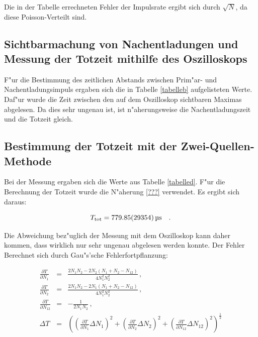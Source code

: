 	Die in der Tabelle errechneten Fehler der Impulsrate ergibt sich durch $\sqrt{N}$, da diese Poisson-Verteilt sind.

	\subsection{Sichtbarmachung von Nachentladungen und Messung der Totzeit mithilfe des Oszilloskops} %
	 \label{sub:sichtbarmachung_von_nachentladungen}

	
	
	F"ur die Bestimmung des zeitlichen Abstands zwischen Prim"ar- und Nachentladungsimpuls ergaben sich die in Tabelle \ref{tabelleb} aufgelisteten Werte. Daf"ur wurde die Zeit zwischen den auf dem Oszilloskop sichtbaren Maximas abgelesen.
	Da dies sehr ungenau ist, ist n"aherungsweise die Nachentladungszeit und die Totzeit gleich.

	\subsection{Bestimmung der Totzeit mit der Zwei-Quellen-Methode} %
	\label{sub:bestimmung_der_totzeit_mit_der_zwei_quellen_methode}
	
	

	Bei der Messung ergaben sich die Werte aus Tabelle \ref{tabelled}.
	F"ur die Berechnung der Totzeit wurde die N"aherung \eqref{???} verwendet.
	Es ergibt sich daraus:

	\begin{equation*}
		T_\mathrm{tot} = \SI{779.85 (29354)}{\micro\second} \quad .
	\end{equation*}

	Die Abweichung bez"uglich der Messung mit dem Oszilloskop kann daher kommen, dass wirklich nur sehr ungenau abgelesen werden konnte.
	Der Fehler Berechnet sich durch Gau"s'sche Fehlerfortpflanzung:

	\begin{eqnarray*}
		\frac{\partial T}{\partial N_\mathrm{1}} &=& \frac{2 N_\mathrm{1}N_\mathrm{2} - 2 N_\mathrm{2}(N_\mathrm{1} + N_\mathrm{2} - N_\mathrm{12})}{4N_\mathrm{1}^2N_\mathrm{2}^2} \, , \\
		\frac{\partial T}{\partial N_\mathrm{2}} &=& \frac{2 N_\mathrm{1}N_\mathrm{2} - 2 N_\mathrm{1}(N_\mathrm{1} + N_\mathrm{2} - N_\mathrm{12})}{4N_\mathrm{1}^2N_\mathrm{2}^2} \, ,\\
		\frac{\partial T}{\partial N_\mathrm{12}} &=& -\frac{1}{2 N_\mathrm{1} N_\mathrm{2}} \, ,\\
		\Delta T &=& \left( \left( \frac{\partial T}{\partial N_\mathrm{1}} \Delta N_\mathrm{1} \right)^2 + \left( \frac{\partial T}{\partial N_\mathrm{2}} \Delta N_\mathrm{2} \right)^2 + \left( \frac{\partial T}{\partial N_\mathrm{12}} \Delta N_\mathrm{12} \right)^2 \right)^\frac{1}{2}
	\end{eqnarray*}